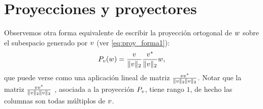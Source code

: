 \section{Proyecciones y proyectores}
\label{sec:proyectores}
Observemos otra forma equivalente de escribir la proyección ortogonal de $\wb$ sobre el subespacio generado por $\vb$ (ver \eqref{eq:proy_forma1}):
\begin{equation}
 \label{eq:proy_forma2}
 \Pb_{\vb}(\wb)=\frac{\vb}{\|\vb\|_2}\frac{\vb^*}{\|\vb\|_2}\wb,
\end{equation}
que puede verse como una aplicación lineal de matriz  $\frac{\vb\vb^*}{\|\vb\|_2\|\vb\|_2}$.
\tcc
Notar que la matriz $\frac{\vb\vb^*}{\|\vb\|_2\|\vb\|_2}$ , asociada a la proyección $\Pb_{\vb}$, tiene rango $1$, de hecho las columnas son todas múltiplos de $\vb$.
\etcc

